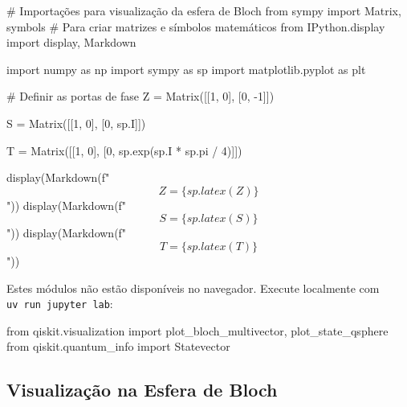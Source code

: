 \documentclass[
  brazilian,
]{report}
\newenvironment{Shaded}{\begin{snugshade}}{\end{snugshade}}
\newcommand{\ImportTok}[1]{\textcolor[rgb]{0.00,0.46,0.62}{#1}}
\newcommand{\NormalTok}[1]{\textcolor[rgb]{0.00,0.23,0.31}{#1}}
\begin{document}
\begin{Shaded}
\begin{Highlighting}[]
\NormalTok{\# Importações para visualização da esfera de Bloch}
\NormalTok{from sympy import Matrix, symbols       \# Para criar matrizes e símbolos matemáticos}
\NormalTok{from IPython.display import display, Markdown}

\NormalTok{import numpy as np}
\NormalTok{import sympy as sp}
\NormalTok{import matplotlib.pyplot as plt}

\NormalTok{\# Definir as portas de fase}
\NormalTok{Z = Matrix([[1, 0],}
\NormalTok{            [0, {-}1]])}

\NormalTok{S = Matrix([[1, 0],}
\NormalTok{            [0, sp.I]])}

\NormalTok{T = Matrix([[1, 0],}
\NormalTok{            [0, sp.exp(sp.I * sp.pi / 4)]])}

\NormalTok{display(Markdown(f"$$Z = \{sp.latex(Z)\}$$"))}
\NormalTok{display(Markdown(f"$$S = \{sp.latex(S)\}$$"))}
\NormalTok{display(Markdown(f"$$T = \{sp.latex(T)\}$$"))}
\end{Highlighting}
\end{Shaded}

\begin{tcolorbox}[enhanced jigsaw, arc=.35mm, bottomrule=.15mm, bottomtitle=1mm, breakable, colback=white, colbacktitle=quarto-callout-note-color!10!white, colframe=quarto-callout-note-color-frame, coltitle=black, left=2mm, leftrule=.75mm, opacityback=0, opacitybacktitle=0.6, rightrule=.15mm, title=\textcolor{quarto-callout-note-color}{\faInfo}\hspace{0.5em}{🔒 Imports do Qiskit (requerem execução local)}, titlerule=0mm, toprule=.15mm, toptitle=1mm]

Estes módulos não estão disponíveis no navegador. Execute localmente com
\texttt{uv\ run\ jupyter\ lab}:

\begin{Shaded}
\begin{Highlighting}[]
\ImportTok{from}\NormalTok{ qiskit.visualization }\ImportTok{import}\NormalTok{ plot\_bloch\_multivector, plot\_state\_qsphere}
\ImportTok{from}\NormalTok{ qiskit.quantum\_info }\ImportTok{import}\NormalTok{ Statevector}
\end{Highlighting}
\end{Shaded}

\end{tcolorbox}

\subsection{Visualização na Esfera de
Bloch}\label{visualizauxe7uxe3o-na-esfera-de-bloch}
\end{document}
